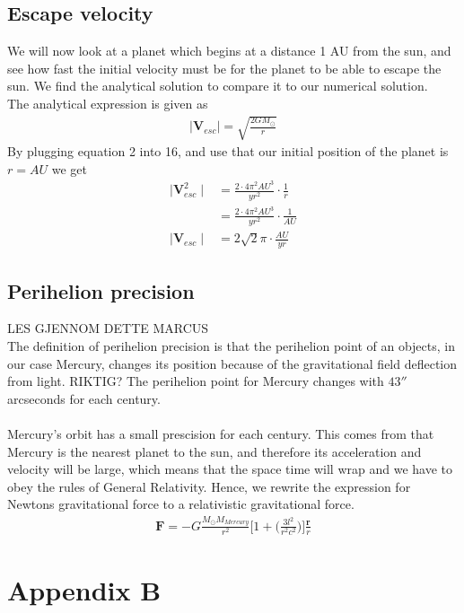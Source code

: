 \documentclass{article}
\begin{document}
\subsection{Escape velocity}
We will now look at a planet which begins at a distance 1 AU from the sun, 
and see how fast the initial velocity must be for the planet to be able to escape the sun. We find the analytical solution to compare it to our numerical solution. \\
The analytical expression is given as 
\begin{align}
    \mid{\mathbf{V}_{esc}}\mid=\sqrt{\frac{2GM_{\odot}}{r}}
\end{align}
By plugging equation 2 into 16, and use that our initial position of the planet is $r=AU$ we get
\begin{align}
\mid{\mathbf{V}_{esc}^2}\mid&=\frac{2\cdot 4\pi^2AU^3}{yr^2}\cdot\frac{1}{r}\\
&=\frac{2\cdot 4\pi^2AU^3}{yr^2}\cdot\frac{1}{AU}\\
\mid{\mathbf{V}_{esc}}\mid&=2\sqrt{2}\pi\cdot\frac{AU}{yr}
\end{align}
\subsection{Perihelion precision}
LES GJENNOM DETTE MARCUS\\
The definition of perihelion precision is that the perihelion point of an objects, in our case Mercury, changes its position because of 
the gravitational field deflection from light. RIKTIG? The perihelion point for Mercury changes with $43''$ arcseconds for each century. \\
\\
Mercury's orbit has a small prescision for each century. This comes from that Mercury is the nearest planet to the sun, and therefore its acceleration and velocity will be large, which means that the space time will wrap    and we have to obey the rules of General Relativity. Hence, we rewrite the expression for Newtons gravitational force to a relativistic gravitational force.
\begin{align}
    \mathbf{F}=-G\frac{M_{\odot}M_{Mercury}}{r^2}\Bigg[1+\Bigg(\frac{3l^2}{r^2c^2}\bigg)\bigg]\frac{\mathbf{r}}{r}
\end{align}

\section{Appendix B} %
\end{document}
